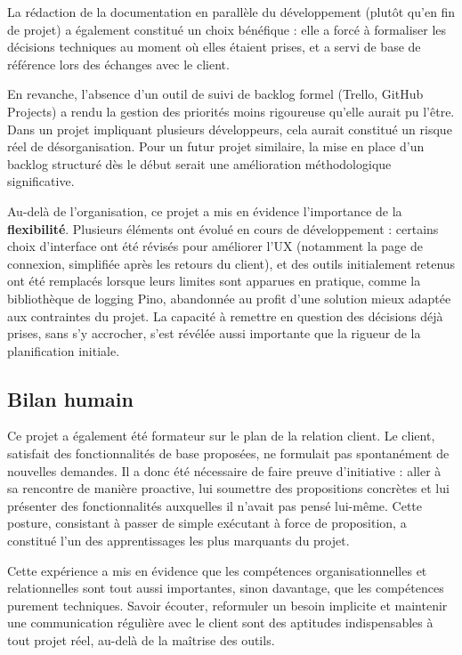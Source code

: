 \documentclass[12pt,a4paper]{article}
\begin{document}
La rédaction de la documentation en parallèle du développement (plutôt qu'en fin de projet) a également constitué un choix bénéfique : elle a forcé à formaliser les décisions techniques au moment où elles étaient prises, et a servi de base de référence lors des échanges avec le client.

En revanche, l'absence d'un outil de suivi de backlog formel (Trello, GitHub Projects) a rendu la gestion des priorités moins rigoureuse qu'elle aurait pu l'être. Dans un projet impliquant plusieurs développeurs, cela aurait constitué un risque réel de désorganisation. Pour un futur projet similaire, la mise en place d'un backlog structuré dès le début serait une amélioration méthodologique significative.

Au-delà de l'organisation, ce projet a mis en évidence l'importance de la \textbf{flexibilité}. Plusieurs éléments ont évolué en cours de développement : certains choix d'interface ont été révisés pour améliorer l'UX (notamment la page de connexion, simplifiée après les retours du client), et des outils initialement retenus ont été remplacés lorsque leurs limites sont apparues en pratique, comme la bibliothèque de logging Pino, abandonnée au profit d'une solution mieux adaptée aux contraintes du projet. La capacité à remettre en question des décisions déjà prises, sans s'y accrocher, s'est révélée aussi importante que la rigueur de la planification initiale.

\subsection{Bilan humain}

Ce projet a également été formateur sur le plan de la relation client. Le client, satisfait des fonctionnalités de base proposées, ne formulait pas spontanément de nouvelles demandes. Il a donc été nécessaire de faire preuve d'initiative : aller à sa rencontre de manière proactive, lui soumettre des propositions concrètes et lui présenter des fonctionnalités auxquelles il n'avait pas pensé lui-même. Cette posture, consistant à passer de simple exécutant à force de proposition, a constitué l'un des apprentissages les plus marquants du projet.

Cette expérience a mis en évidence que les compétences organisationnelles et relationnelles sont tout aussi importantes, sinon davantage, que les compétences purement techniques. Savoir écouter, reformuler un besoin implicite et maintenir une communication régulière avec le client sont des aptitudes indispensables à tout projet réel, au-delà de la maîtrise des outils.
\end{document}
